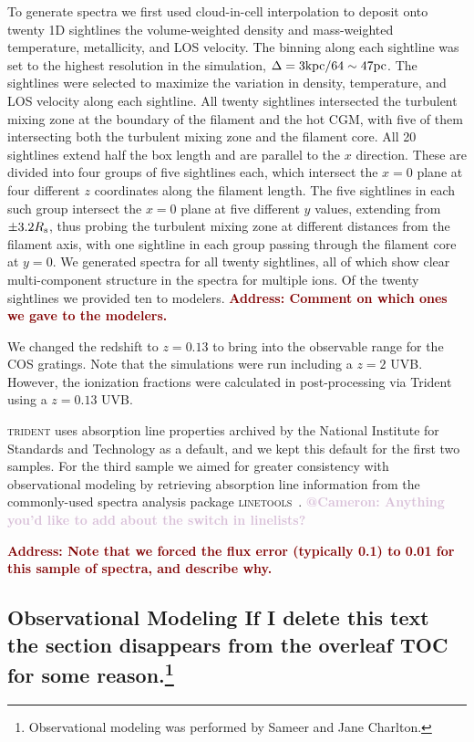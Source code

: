 \documentclass[fleqn,usenatbib]{mnras}
\makeatletter
\newcommand{\todo}[1]{\textcolor{Maroon}{\textbf{Address: #1}}}
\newcommand{\atcameron}[1]{\textcolor{Thistle}{\textbf{@Cameron: #1}}}
\makeatother
\begin{document}
To generate spectra we first used cloud-in-cell interpolation to deposit onto twenty 1D sightlines the volume-weighted density and mass-weighted temperature, metallicity, and LOS velocity.
The binning along each sightline was set to the highest resolution in the simulation, $\Delta=3{\rm kpc}/64\sim 47{\rm pc}$.
The sightlines were selected to maximize the variation in density, temperature, and LOS velocity along each sightline.
All twenty sightlines intersected the turbulent mixing zone at the boundary of the filament and the hot CGM, with five of them intersecting both the turbulent mixing zone and the filament core.
All 20 sightlines extend half the box length and are parallel to the $x$ direction.
These are divided into four groups of five sightlines each, which intersect the $x=0$ plane at four different $z$ coordinates along the filament length.
The five sightlines in each such group intersect the $x=0$ plane at five different $y$ values, extending from $\pm 3.2R_{\rm s}$, thus probing the turbulent mixing zone at different distances from the filament axis, with one sightline in each group passing through the filament core at $y=0$.
We generated spectra for all twenty sightlines, all of which show clear multi-component structure in the spectra for multiple ions.
Of the twenty sightlines we provided ten to modelers.
\todo{Comment on which ones we gave to the modelers.}

We changed the redshift to $z=0.13$ to bring  into the observable range for the COS gratings.
Note that the simulations were run including a $z=2$ UVB.
However, the ionization fractions were calculated in post-processing via Trident using a $z=0.13$ \cite{Haardt2012} UVB.

\textsc{trident} uses absorption line properties archived by the National Institute for Standards and Technology as a default, and we kept this default for the first two samples.
For the third sample we aimed for greater consistency with observational modeling by retrieving absorption line information from the commonly-used spectra analysis package \textsc{linetools}~\citep{Prochaska2016}.
\atcameron{Anything you'd like to add about the switch in linelists?}

\todo{Note that we forced the flux error (typically 0.1) to 0.01 for this sample of spectra, and describe why.}

\subsection[Observational Modeling]{Observational Modeling \textbf{If I delete this text the section disappears from the overleaf TOC for some reason.}\footnote{
Observational modeling was performed by Sameer and Jane Charlton.}}
\label{s: observational modeling}
\end{document}
